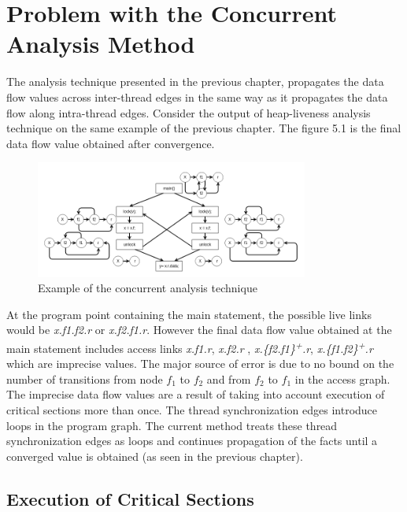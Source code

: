 \chapter{Problem with the Concurrent Analysis Method}

The analysis technique presented in the previous chapter, propagates the data flow values across inter-thread edges in the same way as it propagates the data flow along intra-thread edges. Consider the output of heap-liveness analysis technique on the same example of the previous chapter. The figure 5.1 is the final data flow value obtained after convergence. \\

	\begin{figure}
		\centering
		\includegraphics[width=0.8\textwidth]{Figures/conc_analysis_itr4.png}
		\caption{Example of the concurrent analysis technique}
		\label{fig:ch5example}
	\end{figure}


At the program point containing the main statement, the possible live links would be \emph{x.f1.f2.r} or \emph{x.f2.f1.r}. However the final data flow value  obtained at the main statement includes access links \emph{x.f1.r}, \emph{x.f2.r} , \emph {x.\{f2.f1\}\textsuperscript{+}.r}, \emph{x.\{f1.f2\}\textsuperscript{+}.r} which are imprecise values. The major source of error is due to no bound on the number of transitions from node $f_1$ to $f_2$ and from $f_2$ to $f_1$ in the access graph. \\

The imprecise data flow values are a result of taking into account execution of critical sections more than once. The thread synchronization edges introduce loops in the program graph. The current method treats these thread synchronization edges as loops and continues propagation of the facts until a converged value is obtained (as seen in the previous chapter). \\

\section{Execution of Critical Sections}

